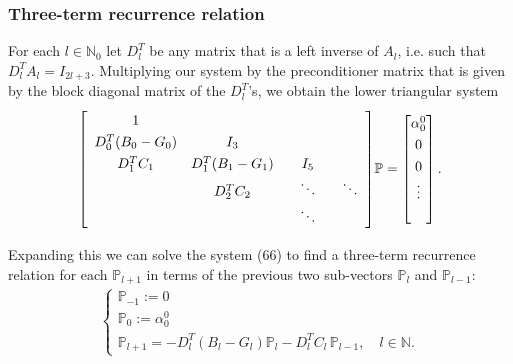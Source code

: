 \documentclass[10pt]{beamer}
\newcommand{\N}{\mathbb{N}}
\newcommand{\No}{\mathbb{N}_0}
\newcommand{\bigP}{\mathbb{P}}
\newcommand{\Pl}{\mathbb{P}_l}
\newcommand{\Dlt}{D^T_l}
\begin{document}
\frame
{
    \frametitle{Three-term recurrence relation}

For each \(l \in \No\) let \(\Dlt\) be any matrix that is a left inverse of \(A_l\), i.e. such that \(\Dlt A_l = I_{2l+3}\). Multiplying our system by the preconditioner matrix that is given by the block diagonal matrix of the \(\Dlt\)'s, we obtain the lower triangular system \citep{dunkl2014orthogonal}
\begin{align}
\renewcommand\arraystretch{1.3}
\mleft[
\begin{array}{cccc}
		1  & & & \\
		D^T_0(B_0-G_0) & I_3 & & \\
		D^T_1 C_1 & D^T_1(B_1-G_1) & \quad I_5 \quad & \\
		& D^T_2 C_2 & \ddots & \ddots \\
		& & \ddots &
\end{array}
\mright]
\bigP
=
\begin{bmatrix}
	\alpha^0_0 \\ 0 \\ 0 \\ \vdots \\ \\
\end{bmatrix}.
\end{align}

Expanding this we can solve the system (66) to find a three-term recurrence relation for each \(\bigP_{l+1}\) in terms of the previous two sub-vectors \(\Pl\) and \(\bigP_{l-1}\):
\begin{align}
\begin{cases}
\bigP_{-1} := 0 \\
\bigP_{0} := \alpha^0_0 \\
\bigP_{l+1} = -\Dlt (B_l-G_l) \Pl - \Dlt C_l  \,\bigP_{l-1}, \quad l \in \N.
\end{cases}
\end{align}

}
\end{document}
